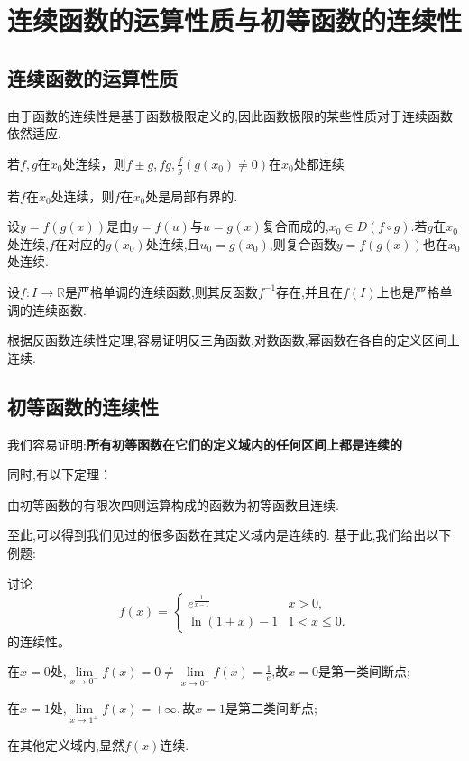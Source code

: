 \section{连续函数的运算性质与初等函数的连续性}
\subsection{连续函数的运算性质}
由于函数的连续性是基于函数极限定义的,因此函数极限的某些性质对于连续函数依然适应.

\begin{theorem}
	若$f,g$在$x_0$处连续，则$f\pm g,fg,\frac{f}{g}(g(x_0)\ne 0)$在$x_0$处都连续
\end{theorem}

\begin{theorem}
	若$f$在$x_0$处连续，则$f$在$x_0$处是局部有界的.
\end{theorem}

\begin{theorem}
	设$y=f(g(x))$是由$y=f(u)$与$u=g(x)$复合而成的,$x_0\in D(f\circ g).$若$g$在$x_0$处连续,$f$在对应的$g(x_0)$处连续,且$u_0=g(x_0)$,则复合函数$y=f(g(x))$也在$x_0$处连续.
\end{theorem}

\begin{theorem}
	设$f:I\to \mathbb{R}$是严格单调的连续函数,则其反函数$f^{-1}$存在,并且在$f(I)$上也是严格单调的连续函数.
\end{theorem}

根据反函数连续性定理,容易证明反三角函数,对数函数,幂函数在各自的定义区间上连续.

\subsection{初等函数的连续性}

我们容易证明:\textbf{所有初等函数在它们的定义域内的任何区间上都是连续的}

同时,有以下定理：
\begin{theorem}
	由初等函数的有限次四则运算构成的函数为初等函数且连续.
\end{theorem}
至此,可以得到我们见过的很多函数在其定义域内是连续的.
基于此,我们给出以下例题:
\begin{example}
	讨论
	\begin{equation*}
		f(x) =
		\begin{cases}
			e^{\frac{1}{x-1}} & x >0,      \\
			\ln{(1+x)}-1      & 1<x\le 0 .
		\end{cases}
	\end{equation*}
	的连续性。
\end{example}
\begin{solution}
	在$x=0$处,$\lim\limits_{x\to 0^-}f(x)=0\ne \lim\limits_{x\to 0^+}f(x)=\frac{1}{e}$,故$x=0$是第一类间断点;

	在$x=1$处,$\lim\limits_{x\to 1^+}f(x)=+\infty,$故$x=1$是第二类间断点;

	在其他定义域内,显然$f(x)$连续.
\end{solution}

